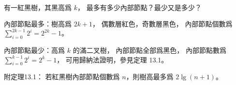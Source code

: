 \startEXERCISE
有一紅黑樹，其黑高爲 $k$，
最多有多少內部節點？最少又是多少？
\stopEXERCISE

\startANSWER
內部節點最多：樹高爲 $2k+1$，
偶數層紅色，奇數層黑色，
內部節點個數爲 $\sum_{i=0}^{2k-1}2^{i} = 2^{2k}-1$。

內部節點最少：高爲 $k$ 的滿二叉樹，
內部節點全部爲黑色，
內部節點數爲 $\sum_{i=0}^{k-1}2^{i} = 2^k-1$，
可用歸納法證明，參見定理 13.1。

附定理13.1：
若紅黑樹內部節點個數爲 $n$，則樹高最多爲 $2\lg(n+1)$。
\stopANSWER
